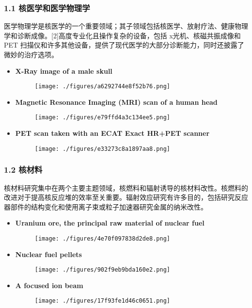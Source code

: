 \subsubsection{1.1 核医学和医学物理学}
医学物理学是核医学的一个重要领域；其子领域包括核医学、放射疗法、健康物理学和诊断成像。[2]高度专业化且操作复杂的设备，包括 x光机、核磁共振成像和 PET 扫描仪和许多其他设备，提供了现代医学的大部分诊断能力，同时还披露了微妙的治疗选项。
\begin{itemize}
\item \textbf{X-Ray image of a male skull}
\begin{figure}[ht]
\centering
\texttt{[image: ./figures/a6292744e8f52b76.png]}
\caption\label{fig_HGC_3}
\end{figure}
\item \textbf{Magnetic Resonance Imaging (MRI) scan of a human head}
\begin{figure}[ht]
\centering
\texttt{[image: ./figures/e79ffd4a3c134ee5.png]}
\caption \label{fig_HGC_5}
\end{figure}
\item \textbf{PET scan taken with an ECAT Exact HR+PET scanner}
\begin{figure}[ht]
\centering
\texttt{[image: ./figures/e33273c8a1897aa8.png]}
\caption\label{fig_HGC_6}
\end{figure}
\end{itemize}

\subsubsection{1.2 核材料}
核材料研究集中在两个主要主题领域，核燃料和辐射诱导的核材料改性。核燃料的改进对于提高核反应堆的效率至关重要。辐射效应研究有许多目的，包括研究反应器部件的结构变化和使用离子束或粒子加速器研究金属的纳米改性。
\begin{itemize}
\item \textbf{Uranium ore, the principal raw material of nuclear fuel}
\begin{figure}[ht]
\centering
\texttt{[image: ./figures/4e70f097838d2de8.png]}
\caption\label{fig_HGC_7}
\end{figure}
\item \textbf{Nuclear fuel pellets}
\begin{figure}[ht]
\centering
\texttt{[image: ./figures/902f9eb9bda160e2.png]}
\caption\label{fig_HGC_8}
\end{figure}
\item \textbf{A focused ion beam}
\begin{figure}[ht]
\centering
\texttt{[image: ./figures/17f93fe1d46c0651.png]}
\caption\label{fig_HGC_9}
\end{figure}
\end{itemize}

